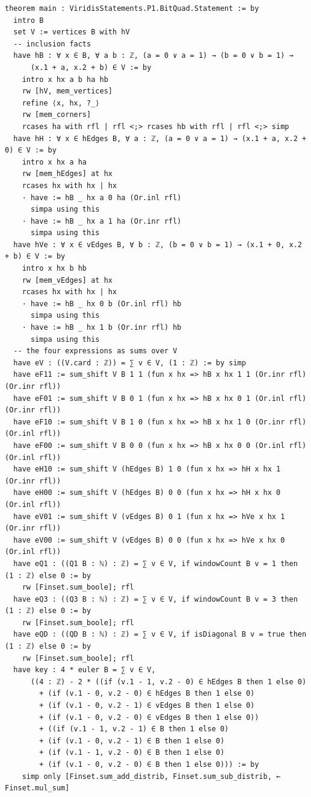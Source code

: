 \documentclass[11pt]{article}
\theoremstyle{definition}
\theoremstyle{remark}
\begin{document}
\begin{lstlisting}
theorem main : ViridisStatements.P1.BitQuad.Statement := by
  intro B
  set V := vertices B with hV
  -- inclusion facts
  have hB : ∀ x ∈ B, ∀ a b : ℤ, (a = 0 ∨ a = 1) → (b = 0 ∨ b = 1) →
      (x.1 + a, x.2 + b) ∈ V := by
    intro x hx a b ha hb
    rw [hV, mem_vertices]
    refine ⟨x, hx, ?_⟩
    rw [mem_corners]
    rcases ha with rfl | rfl <;> rcases hb with rfl | rfl <;> simp
  have hH : ∀ x ∈ hEdges B, ∀ a : ℤ, (a = 0 ∨ a = 1) → (x.1 + a, x.2 + 0) ∈ V := by
    intro x hx a ha
    rw [mem_hEdges] at hx
    rcases hx with hx | hx
    · have := hB _ hx a 0 ha (Or.inl rfl)
      simpa using this
    · have := hB _ hx a 1 ha (Or.inr rfl)
      simpa using this
  have hVe : ∀ x ∈ vEdges B, ∀ b : ℤ, (b = 0 ∨ b = 1) → (x.1 + 0, x.2 + b) ∈ V := by
    intro x hx b hb
    rw [mem_vEdges] at hx
    rcases hx with hx | hx
    · have := hB _ hx 0 b (Or.inl rfl) hb
      simpa using this
    · have := hB _ hx 1 b (Or.inr rfl) hb
      simpa using this
  -- the four expressions as sums over V
  have eV : ((V.card : ℤ)) = ∑ v ∈ V, (1 : ℤ) := by simp
  have eF11 := sum_shift V B 1 1 (fun x hx => hB x hx 1 1 (Or.inr rfl) (Or.inr rfl))
  have eF01 := sum_shift V B 0 1 (fun x hx => hB x hx 0 1 (Or.inl rfl) (Or.inr rfl))
  have eF10 := sum_shift V B 1 0 (fun x hx => hB x hx 1 0 (Or.inr rfl) (Or.inl rfl))
  have eF00 := sum_shift V B 0 0 (fun x hx => hB x hx 0 0 (Or.inl rfl) (Or.inl rfl))
  have eH10 := sum_shift V (hEdges B) 1 0 (fun x hx => hH x hx 1 (Or.inr rfl))
  have eH00 := sum_shift V (hEdges B) 0 0 (fun x hx => hH x hx 0 (Or.inl rfl))
  have eV01 := sum_shift V (vEdges B) 0 1 (fun x hx => hVe x hx 1 (Or.inr rfl))
  have eV00 := sum_shift V (vEdges B) 0 0 (fun x hx => hVe x hx 0 (Or.inl rfl))
  have eQ1 : ((Q1 B : ℕ) : ℤ) = ∑ v ∈ V, if windowCount B v = 1 then (1 : ℤ) else 0 := by
    rw [Finset.sum_boole]; rfl
  have eQ3 : ((Q3 B : ℕ) : ℤ) = ∑ v ∈ V, if windowCount B v = 3 then (1 : ℤ) else 0 := by
    rw [Finset.sum_boole]; rfl
  have eQD : ((QD B : ℕ) : ℤ) = ∑ v ∈ V, if isDiagonal B v = true then (1 : ℤ) else 0 := by
    rw [Finset.sum_boole]; rfl
  have key : 4 * euler B = ∑ v ∈ V,
      ((4 : ℤ) - 2 * ((if (v.1 - 1, v.2 - 0) ∈ hEdges B then 1 else 0)
        + (if (v.1 - 0, v.2 - 0) ∈ hEdges B then 1 else 0)
        + (if (v.1 - 0, v.2 - 1) ∈ vEdges B then 1 else 0)
        + (if (v.1 - 0, v.2 - 0) ∈ vEdges B then 1 else 0))
        + ((if (v.1 - 1, v.2 - 1) ∈ B then 1 else 0)
        + (if (v.1 - 0, v.2 - 1) ∈ B then 1 else 0)
        + (if (v.1 - 1, v.2 - 0) ∈ B then 1 else 0)
        + (if (v.1 - 0, v.2 - 0) ∈ B then 1 else 0))) := by
    simp only [Finset.sum_add_distrib, Finset.sum_sub_distrib, ← Finset.mul_sum]

\end{lstlisting}
\end{document}
